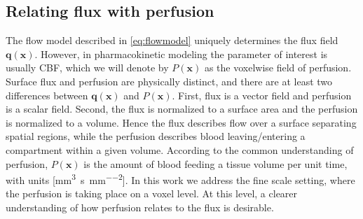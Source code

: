 \documentclass[final,5p,times,twocolumn]{elsarticle}
\begin{document}


	\subsection{Relating flux with perfusion}\label{sec:flux2perf}
	The flow model described in \eqref{eq:flowmodel} uniquely determines the flux field $\mathbf{q}(\mathbf{x})$. 
	However, in pharmacokinetic modeling the parameter of interest is usually CBF, which we will denote by $P (\mathbf{x})$ as the voxelwise field of perfusion. Surface flux and perfusion are physically distinct, and there are at least two differences between $\mathbf{q}(\mathbf{x})$ and $P (\mathbf{x})$. 
	First, flux is a vector field and perfusion is a scalar field. Second, the flux is normalized to a surface area and the perfusion is normalized to a volume. 
	Hence the flux describes flow over a surface separating spatial regions, while the perfusion describes blood leaving/entering a compartment within a given volume. 	
According to the common understanding of perfusion,
	 $P (\mathbf{x})$ is the amount of blood feeding a tissue volume per unit time, with units [\si{\milli\meter\cubed\per\second\per\milli\meter\squared}]. 
	 In this work we address the  fine scale setting, where the perfusion is taking place on a voxel level. At this level, a clearer understanding of how perfusion relates to the flux is desirable.  
\end{document}
